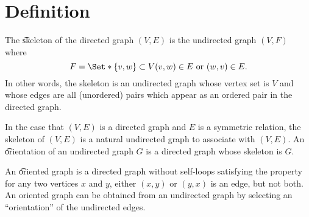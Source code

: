 
\section*{Definition}

The \t{skeleton} of the directed graph $(V, E)$ is the undirected graph $(V, F)$ where
\[
F = \Set*{\set{v, w} \subset V}{(v, w) \in E \text{ or } (w, v) \in E}.
\]
In other words, the skeleton is an undirected graph whose vertex set is $V$ and whose edges are all (unordered) pairs which appear as an ordered pair in the directed graph.

In the case that $(V, E)$ is a directed graph and $E$ is a symmetric relation, the skeleton of $(V, E)$ is a natural undirected graph to associate with $(V, E)$.
An \t{orientation} of an undirected graph $G$ is a directed graph whose skeleton is $G$.

An \t{oriented graph} is a directed graph without self-loops satisfying the property for any two vertices $x$ and $y$, either $(x,y)$ or $(y,x)$ is an edge, but not both.
An oriented graph can be obtained from an undirected graph by selecting an ``orientation'' of the undirected edges.

\blankpage
